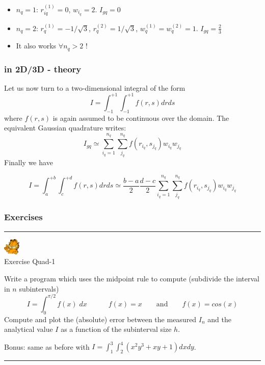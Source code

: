 \begin{itemize}
\item $n_q=1$: $r_{iq}^{(1)}=0$, $w_{i_q}=2$. $I_{gq}=0$
\item $n_q=2$: $r_{q}^{(1)}=-1/\sqrt{3}$, $r_{q}^{(2)}=1/\sqrt{3}$, $w_{q}^{(1)}=w_{q}^{(2)}=1$. $I_{gq}=\frac{2}{3}$
\item It also works $\forall n_q>2$ !
\end{itemize}

\subsubsection{in 2D/3D - theory}

Let us now turn to a two-dimensional integral of the form
\[
I=\int_{-1}^{+1} \int_{-1}^{+1} f(r,s) dr ds
\]
where $f(r,s)$ is again assumed to be continuous over the domain. 
The equivalent Gaussian quadrature writes:
\[
I_{gq}
\simeq \sum_{i_q=1}^{n_q}\sum_{j_q}^{n_q} f(r_{i_q},s_{j_q}) w_{i_q} w_{j_q}
\]
Finally we have 
\begin{mdframed}[backgroundcolor=blue!5]
\begin{equation}
I=\int_{a}^{+b}\int_{c}^{+d} f(r,s) dr ds
\simeq \frac{b-a}{2} \frac{d-c}{2} 
\sum_{i_q=1}^{n_q}\sum_{j_q}^{n_q} f(r_{i_q},s_{j_q}) w_{i_q} w_{j_q}
\end{equation}
\end{mdframed}

\subsubsection{Exercises}

\begin{center}
\begin{minipage}[t]{0.77\textwidth}
\par\noindent\rule{\textwidth}{0.4pt}

\begin{center}
\includegraphics[width=0.8cm]{images/garftr} \\
{\color{orange}Exercise Quad-1}
\end{center}

Write a program which uses the midpoint rule to compute (subdivide the interval in $n$ subintervals)
\[
I=\int_{0}^{\pi/2} f(x) \; dx    \quad \qquad f(x)=x \qquad \text{and} \qquad f(x)=cos(x)
\]
Compute and plot the (absolute) error between the measured $I_n$ and the analytical value $I$ as a function of the subinterval size $h$.

Bonus: same as before with $I=\int_{1}^{3}\int_{2}^{4} (x^2y^3 + xy +1)  dx dy$.
\par\noindent\rule{\textwidth}{0.4pt}
\end{minipage}
\end{center}


